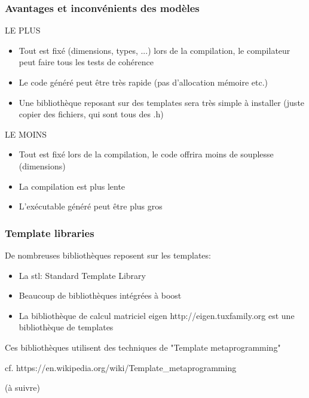 \documentclass{beamer}
\begin{document}
\begin{frame}
\frametitle {Avantages et inconvénients des modèles}

\begin{block}{LE PLUS}
\begin{itemize}
\item{Tout est fixé (dimensions, types, ...) lors de la compilation, le compilateur peut faire tous les tests de cohérence}
\item{Le code généré peut être très rapide (pas d'allocation mémoire etc.)}
\item{Une bibliothèque reposant sur des templates sera très simple à installer (juste copier des fichiers, qui sont tous des .h)}
\end{itemize}
\end{block}

\begin{block}{LE MOINS}
\begin{itemize}
\item{Tout est fixé lors de la compilation, le code offrira moins de souplesse (dimensions)}
\item{La compilation est plus lente}
\item{L'exécutable généré peut être plus gros}
\end{itemize}
\end{block}
\end{frame}

\begin{frame}
\frametitle {Template libraries}
De nombreuses bibliothèques reposent sur les templates:
\begin{itemize}
\item{La stl: Standard Template Library}
\item{Beaucoup de bibliothèques intégrées à boost}
\item{La bibliothèque de calcul matriciel eigen http://eigen.tuxfamily.org est une bibliothèque de templates}
\end{itemize}
Ces bibliothèques utilisent des techniques de "Template metaprogramming"

cf. https://en.wikipedia.org/wiki/Template\_metaprogramming

\end{frame}

\begin{frame}
(à suivre)
\end{frame}
\end{document}
